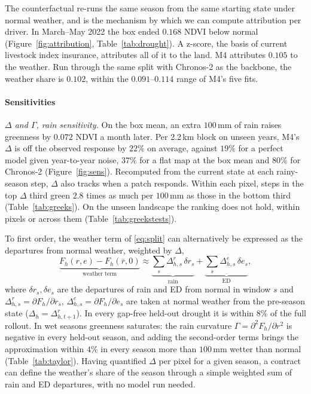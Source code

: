 \documentclass[letterpaper]{article} %
\begin{document}
The counterfactual re-runs the same season from the same starting state under normal weather, and is the mechanism by which we can compute attribution per driver. In March--May 2022 the box ended $0.168$ NDVI below normal (Figure~\ref{fig:attribution}, Table~\ref{tab:drought}). A z-score, the basis of current livestock index insurance, attributes all of it to the land. M4 attributes $0.105$ to the weather. Run through the same split with Chronos-2 as the backbone, the weather share is $0.102$, within the $0.091$--$0.114$ range of M4's five fits.

\paragraph{Sensitivities}

\textit{$\Delta$ and $\Gamma$, rain sensitivity.} On the box mean, an extra $100$\,mm of rain raises greenness by $0.072$ NDVI a month later. Per 2.2\,km block on unseen years, M4's $\Delta$ is off the observed response by $22\%$ on average, against $19\%$ for a perfect model given year-to-year noise, $37\%$ for a flat map at the box mean and $80\%$ for Chronos-2 (Figure~\ref{fig:sens}). Recomputed from the current state at each rainy-season step, $\Delta$ also tracks when a patch responds. Within each pixel, steps in the top $\Delta$ third green $2.8$ times as much per $100$\,mm as those in the bottom third (Table~\ref{tab:greeks}). On the unseen landscape the ranking does not hold, within pixels or across them (Table~\ref{tab:greekstests}).

To first order, the weather term of \eqref{eq:split} can alternatively be expressed as the departures from normal weather, weighted by $\Delta$,
\begin{equation}
\underbrace{F_h(r,e)-F_h(\bar r,0)}_{\text{weather term}}\approx\underbrace{\textstyle\sum_s \Delta^{r}_{h,s}\,\delta r_s}_{\text{rain}}+\underbrace{\textstyle\sum_s \Delta^{e}_{h,s}\,\delta e_s}_{\text{ED}},
\label{eq:taylor}
\end{equation}
where $\delta r_s,\delta e_s$ are the departures of rain and ED from normal in window $s$ and $\Delta^r_{h,s}=\partial F_h/\partial r_s$, $\Delta^e_{h,s}=\partial F_h/\partial e_s$ are taken at normal weather from the pre-season state ($\Delta_h=\Delta^r_{h,t+1}$). In every gap-free held-out drought it is within $8\%$ of the full rollout. In wet seasons greenness saturates: the rain curvature $\Gamma=\partial^2F_h/\partial r^2$ is negative in every held-out season, and adding the second-order terms brings the approximation within $4\%$ in every season more than $100$\,mm wetter than normal (Table~\ref{tab:taylor}). Having quantified $\Delta$ per pixel for a given season, a contract can define the weather's share of the season through a simple weighted sum of rain and ED departures, with no model run needed.
\end{document}
